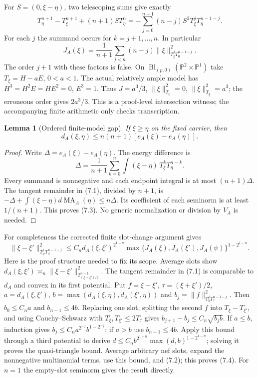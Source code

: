 \documentclass[10pt]{article}
\newtheorem{lemma}[theorem]{Lemma}
\newcommand{\MA}{\operatorname{MA}}
\begin{document}
For $S=(0,\xi-\eta)$, two telescoping sums give exactly
\[
 T_\eta^{n+1}-T_\xi^{n+1}+(n+1)S T_\eta^n
 =-\sum_{j=0}^{n-1}(n-j)S^2T_\xi^jT_\eta^{n-1-j}.
\tag{7.1}
\]
For each $j$ the summand occurs for $k=j+1,\ldots,n$. In particular
\[
 J_A(\xi)=\frac1{n+1}\sum_{j<n}(n-j)\|\xi\|_{T_\xi^jT_0^{n-1-j}}^2.
\tag{7.2}
\]
The order $j+1$ with these factors is false. On
$\operatorname{Bl}_{(p,0)}(\mathbb P^2\times\mathbb P^1)$ take
$T_\xi=H-aE$, $0<a<1$. The actual relatively ample model has
$H^3=H^2E=HE^2=0$, $E^3=1$. Thus
$J=a^3/3$, $\|\xi\|_{T_0}^2=0$, $\|\xi\|_{T_\xi}^2=a^3$;
the erroneous order gives $2a^3/3$. This is a proof-level intersection
witness; the accompanying finite arithmetic only checks transcription.

\begin{lemma}[Ordered finite-model gap]\label{gap}
If $\xi\geq\eta$ on the fixed carrier, then
\[
 d_A(\xi,\eta)\leq n(n+1)[e_A(\xi)-e_A(\eta)].
\tag{7.3}
\]
\end{lemma}
\begin{proof}
Write $\Delta=e_A(\xi)-e_A(\eta)$. The energy difference is
\[
 \Delta=\frac1{n+1}\sum_{k=0}^n
 \int(\xi-\eta)\,T_\xi^kT_\eta^{n-k}.
\]
Every summand is nonnegative and each endpoint integral is at most
$(n+1)\Delta$. The tangent remainder in (7.1), divided by $n+1$, is
$-\Delta+\int(\xi-\eta)d\MA_A(\eta)\leq n\Delta$.
Its coefficient of each seminorm is at least $1/(n+1)$.
This proves (7.3). No generic normalization or division by $V_A$ is needed.
\end{proof}

For completeness the corrected finite slot-change argument gives
\[
 \|\xi-\xi'\|_{T_\psi^jT_0^{n-1-j}}^2
 \leq C_n d_A(\xi,\xi')^{2^{1-n}}
       \max\{J_A(\xi),J_A(\xi'),J_A(\psi)\}^{1-2^{1-n}}.
\tag{7.4}
\]
Here is the proof structure needed to fix its scope. Average slots show
$d_A(\xi,\xi')\asymp_n\|\xi-\xi'\|_{T_{(\xi+\xi')/2}^{n-1}}^2$.
The tangent remainder in (7.1) is comparable to $d_A$ and convex in its
first potential. Put $f=\xi-\xi'$, $\tau=(\xi+\xi')/2$,
$a=d_A(\xi,\xi')$, $b=\max(d_A(\xi,\eta),d_A(\xi',\eta))$ and
$b_j=\|f\|_{T_\eta^jT_\tau^{n-1-j}}^2$. Then $b_0\leq C_na$ and
$b_{n-1}\leq4b$. Replacing one slot, splitting the second $f$ into
$T_\xi-T_{\xi'}$, and using Cauchy--Schwarz with
$T_\xi,T_{\xi'}\leq2T_\tau$ gives
$b_{j+1}-b_j\leq C_n\sqrt{b_j b}$. If $a\leq b$, induction gives
$b_j\leq C_n a^{2^{-j}}b^{1-2^{-j}}$; if $a>b$ use $b_{n-1}\leq4b$.
Apply this bound through a third potential to derive
$d\leq C_n b^{2^{1-n}}\max(d,b)^{1-2^{1-n}}$; solving it proves
the quasi-triangle bound. Average arbitrary nef slots, expand the
nonnegative multinomial terms, use this bound, and (7.2); this proves
(7.4). For $n=1$ the empty-slot seminorm gives the result directly.
\end{document}
